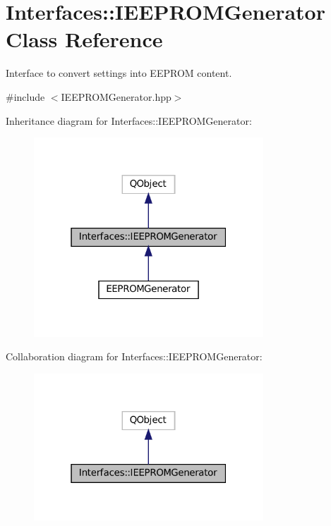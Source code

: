 \hypertarget{class_interfaces_1_1_i_e_e_p_r_o_m_generator}{}\section{Interfaces\+:\+:I\+E\+E\+P\+R\+O\+M\+Generator Class Reference}
\label{class_interfaces_1_1_i_e_e_p_r_o_m_generator}


Interface to convert settings into E\+E\+P\+R\+OM content.  




{\ttfamily \#include $<$I\+E\+E\+P\+R\+O\+M\+Generator.\+hpp$>$}



Inheritance diagram for Interfaces\+:\+:I\+E\+E\+P\+R\+O\+M\+Generator\+:\nopagebreak
\begin{figure}[H]
\begin{center}
\leavevmode
\includegraphics[width=244pt]{class_interfaces_1_1_i_e_e_p_r_o_m_generator__inherit__graph}
\end{center}
\end{figure}


Collaboration diagram for Interfaces\+:\+:I\+E\+E\+P\+R\+O\+M\+Generator\+:\nopagebreak
\begin{figure}[H]
\begin{center}
\leavevmode
\includegraphics[width=244pt]{class_interfaces_1_1_i_e_e_p_r_o_m_generator__coll__graph}
\end{center}
\end{figure}
